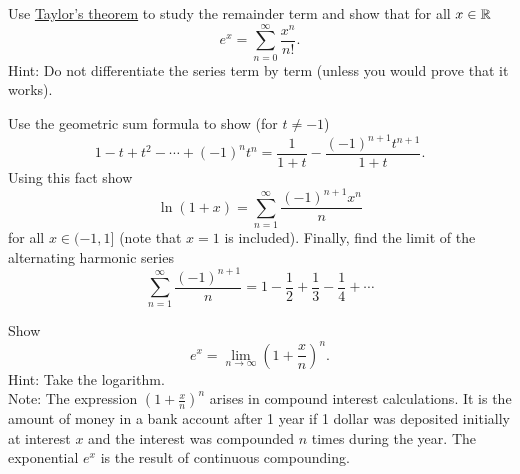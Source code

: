\begin{exercise}
Use \hyperref[thm:taylor]{Taylor's theorem} to study the remainder term and show that for
all $x \in {\mathbb{R}}$
\begin{equation*}
e^x = \sum_{n=0}^\infty \frac{x^n}{n!} .
\end{equation*}
Hint: Do not differentiate the series term by term (unless you would prove that it
works).
\end{exercise}

\begin{exercise}
Use the geometric sum formula to show (for $t\not= -1$)
\begin{equation*}
1-t+t^2-\cdots+{(-1)}^n t^n = \frac{1}{1+t} - \frac{{(-1)}^{n+1}t^{n+1}}{1+t}.
\end{equation*}
Using this fact show
\begin{equation*}
\ln (1+x) = \sum_{n=1}^\infty \frac{{(-1)}^{n+1}x^n}{n} 
\end{equation*}
for all $x \in (-1,1]$ (note that $x=1$ is included).  Finally,
find the limit of the alternating harmonic series
\begin{equation*}
\sum_{n=1}^\infty \frac{{(-1)}^{n+1}}{n} = 1 - \frac{1}{2} +
\frac{1}{3} - \frac{1}{4} + \cdots
\end{equation*}
\end{exercise}

\begin{exercise}
Show 
\begin{equation*}
e^x = \lim_{n\to\infty} {\left( 1 + \frac{x}{n} \right)}^n .
\end{equation*}
Hint: Take the logarithm.\\
Note: The expression 
${\left( 1 + \frac{x}{n} \right)}^n$ arises in compound interest
calculations.  It is the amount of money in a bank account after 1 year
if 1 dollar was deposited initially at interest $x$
and the interest was compounded $n$
times during the year.  The exponential $e^x$ is the result of continuous
compounding.
\end{exercise}

